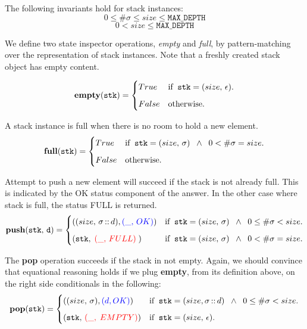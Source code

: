 \documentclass[10pt]{article}
\begin{document}
    The following invariants hold for stack instances:
    \[
        0 \leq \#\sigma \leq size \leq \mathtt{MAX\_DEPTH}
    \]
    \[
        0 < size \leq \mathtt{MAX\_DEPTH}
    \]

    We define two state inspector operations, \emph{empty} and \emph{full}, by pattern-matching over the representation of stack instances. Note that a freshly created stack object has empty content.
    
    \[
        \mathtt{\mathbf{empty}(stk)} = \begin{cases} True & \mbox{if\;\;} \mathtt{stk} = (size, \,\epsilon). \vspace*{6pt}\\ 
        False & \mbox{otherwise}. \end{cases} 
    \]
  
    A stack instance is full when there is no room to hold a new element.
    \[
        \mathtt{\mathbf{full}(stk)} = \begin{cases} True & \mbox{if\;\;} \mathtt{stk} = (size, \,\sigma) \;\; \wedge \;\; 0 < \#\sigma = size. \vspace*{6pt}\\
        False & \mbox{otherwise}. \end{cases} 
    \]

    Attempt to push a new element will succeed if the stack is not already full. This is indicated by the OK status component of the answer. In the other case where stack is full, the status FULL is returned.
    \[
        \mathtt{\mathbf{push}(stk,\, d)} = \begin{cases} ((size, \,\sigma \,\mathbf{::}\, d),  {\textcolor{blue}{(\_, \,OK)}}) & \mbox{if\;\;} \mathtt{stk} = (size, \,\sigma) \;\; \wedge \;\; 0 \leq \#\sigma < size. \vspace*{6pt}\\ 
        (\mathtt{stk},\;{\textcolor{red}{(\_, \,FULL)}} \; ) & \mbox{if\;\;} \mathtt{stk} = (size, \,\sigma) \;\; \wedge \;\; 0 < \#\sigma = size. \end{cases} 
    \]

    The \textbf{pop} operation succeeds if the stack in not empty. Again, we should convince that equational reasoning holds if we plug \textbf{empty}, from its definition above, on the right side conditionals in the following:
    \[
        \mathtt{\mathbf{pop}(stk)} = \begin{cases} ((size, \, \sigma), {\textcolor{blue}{(d, OK)}}) & \mbox{if\;\;} \mathtt{stk} = (size, \sigma \,\mathbf{::} \,d) \;\; \wedge \;\; 0 
        \leq \#\sigma < size. \vspace*{6pt}\\ 
        (\mathtt{stk},\,{\textcolor{red}{(\_,\; EMPTY)}})  & \mbox{if\;\;}\mathtt{stk} = (size, \, \epsilon). \end{cases} 
    \]
\end{document}
